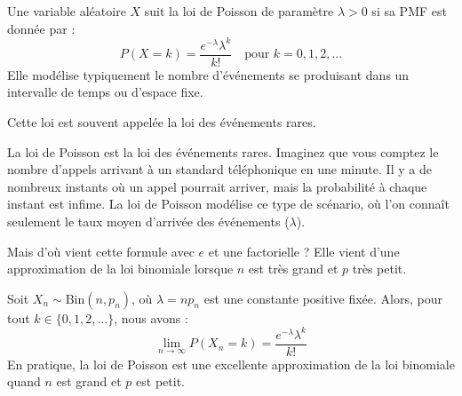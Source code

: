 \begin{definitionbox}
Une variable aléatoire $X$ suit la loi de Poisson de paramètre $\lambda > 0$ si sa PMF est donnée par :
$$ P(X=k) = \frac{e^{-\lambda} \lambda^k}{k!} \quad \text{pour } k=0, 1, 2, \dots $$
Elle modélise typiquement le nombre d'événements se produisant dans un intervalle de temps ou d'espace fixe.
\end{definitionbox}

Cette loi est souvent appelée la loi des événements rares.

\begin{intuitionbox}
La loi de Poisson est la loi des événements rares. Imaginez que vous comptez le nombre d'appels arrivant à un standard téléphonique en une minute. Il y a de nombreux instants où un appel pourrait arriver, mais la probabilité à chaque instant est infime. La loi de Poisson modélise ce type de scénario, où l'on connaît seulement le taux moyen d'arrivée des événements ($\lambda$).
\end{intuitionbox}

Mais d'où vient cette formule avec $e$ et une factorielle ? Elle vient d'une approximation de la loi binomiale lorsque $n$ est très grand et $p$ très petit.

\begin{theorembox}
Soit $X_n \sim \text{Bin}(n, p_n)$, où $\lambda = np_n$ est une constante positive fixée. Alors, pour tout $k \in \{0, 1, 2, \dots\}$, nous avons :
$$ \lim_{n \to \infty} P(X_n=k) = \frac{e^{-\lambda}\lambda^k}{k!} $$
En pratique, la loi de Poisson est une excellente approximation de la loi binomiale quand $n$ est grand et $p$ est petit.
\end{theorembox}

